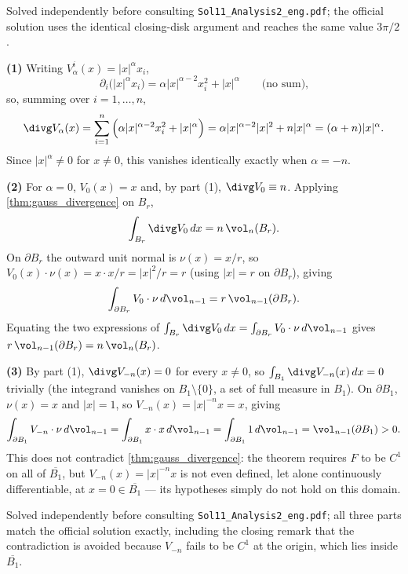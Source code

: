 \begin{ainote}
Solved independently before consulting \texttt{Sol11\_Analysis2\_eng.pdf}; the official
solution uses the identical closing-disk argument and reaches the same value $3\pi/2$.
\end{ainote}

\begin{exercisesolution}
\textbf{(1)} Writing $V_\alpha^i(x) = \lvert x\rvert^\alpha x_i$,
\[
\partial_i\big(\lvert x\rvert^\alpha x_i\big) = \alpha\lvert x\rvert^{\alpha-2}x_i^2
  + \lvert x\rvert^\alpha \qquad \text{(no sum),}
\]
so, summing over $i=1,\ldots,n$,
\[
\divg V_\alpha(x) = \sum_{i=1}^n \Big(\alpha\lvert x\rvert^{\alpha-2}x_i^2 + \lvert
  x\rvert^\alpha\Big) = \alpha\lvert x\rvert^{\alpha-2}\lvert x\rvert^2 + n\lvert x\rvert^\alpha
  = (\alpha+n)\lvert x\rvert^\alpha.
\]
Since $\lvert x\rvert^\alpha \neq 0$ for $x\neq0$, this vanishes identically exactly when
$\alpha = -n$.

\textbf{(2)} For $\alpha=0$, $V_0(x)=x$ and, by part (1), $\divg V_0 \equiv n$. Applying
\cref{thm:gauss_divergence} on $B_r$,
\[\int_{B_r} \divg V_0\,dx = n\,\vol_n(B_r).\]
On $\partial B_r$ the outward unit normal is $\nu(x) = x/r$, so $V_0(x)\cdot\nu(x) = x\cdot
x/r = \lvert x\rvert^2/r = r$ (using $\lvert x\rvert=r$ on $\partial B_r$), giving
\[\int_{\partial B_r} V_0\cdot\nu\,d\vol_{n-1} = r\,\vol_{n-1}(\partial B_r).\]
Equating the two expressions of $\int_{B_r}\divg V_0\,dx = \int_{\partial B_r}V_0\cdot\nu\,
d\vol_{n-1}$ gives $r\,\vol_{n-1}(\partial B_r) = n\,\vol_n(B_r)$.

\textbf{(3)} By part (1), $\divg V_{-n}(x) = 0$ for every $x\neq0$, so $\int_{B_1}\divg
V_{-n}(x)\,dx = 0$ trivially (the integrand vanishes on $B_1\setminus\{0\}$, a set of full
measure in $B_1$). On $\partial B_1$, $\nu(x)=x$ and $\lvert x\rvert=1$, so $V_{-n}(x) =
\lvert x\rvert^{-n}x = x$, giving
\[\int_{\partial B_1} V_{-n}\cdot\nu\,d\vol_{n-1} = \int_{\partial B_1} x\cdot x\,d\vol_{n-1}
  = \int_{\partial B_1} 1\,d\vol_{n-1} = \vol_{n-1}(\partial B_1) > 0.\]
This does not contradict \cref{thm:gauss_divergence}: the theorem requires $F$ to be $C^1$ on
all of $\overline{B_1}$, but $V_{-n}(x) = \lvert x\rvert^{-n}x$ is not even defined, let alone
continuously differentiable, at $x=0 \in \overline{B_1}$ --- its hypotheses simply do not hold
on this domain.
\end{exercisesolution}

\begin{ainote}
Solved independently before consulting \texttt{Sol11\_Analysis2\_eng.pdf}; all three parts
match the official solution exactly, including the closing remark that the contradiction is
avoided because $V_{-n}$ fails to be $C^1$ at the origin, which lies inside $\overline{B_1}$.
\end{ainote}
